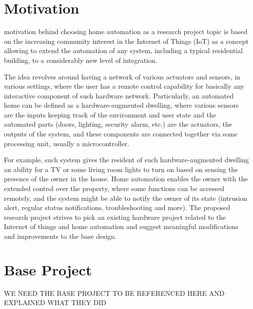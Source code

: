 \documentclass[journal]{IEEEtran}
\begin{document}
\section{Motivation}

%
 motivation behind choosing home automation as a research project topic is based on the increasing community interest in the Internet of Things (IoT) as a concept allowing to extend the automation of any system, including a typical residential building, to a considerably new level of integration.

The idea revolves around having a network of various actuators and sensors, in various settings, where the user has a remote control capability for basically any interactive component of such hardware network. Particularly, an automated home can be defined as a hardware-augmented dwelling, where various sensors are the inputs keeping track of the environment and user state and the automated parts (doors, lighting, security alarm, etc.) are the actuators, the outputs of the system, and these components are connected together via some processing unit, usually a microcontroller.

For example, such system gives the resident of such hardware-augmented dwelling an ability for a TV or some living room lights to turn on based on sensing the presence of the owner in the house. Home automation enables the owner with the extended control over the property, where some functions can be accessed remotely, and the system might be able to notify the owner of its state (intrusion alert, regular status notifications, troubleshooting and more). The proposed research project strives to pick an existing hardware project related to the Internet of things and home automation and suggest meaningful modifications and improvements to the base design.

\section{Base Project}
WE NEED THE BASE PROJECT TO BE REFERENCED HERE AND EXPLAINED WHAT THEY DID
\end{document}
